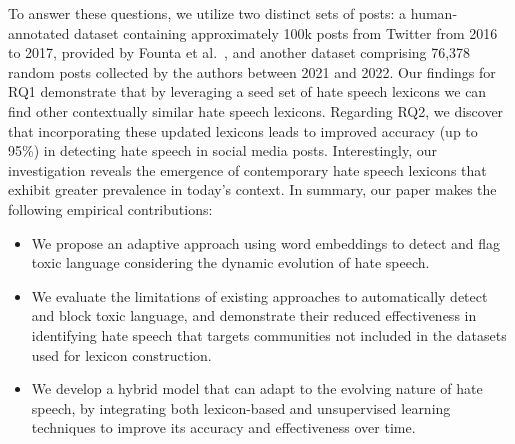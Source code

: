 To answer these questions, we utilize two distinct sets of posts: a human-annotated dataset containing approximately 100k posts from Twitter from 2016 to 2017, provided by Founta et al.~\cite{founta2018large}, and another dataset comprising 76,378 random posts collected by the authors between 2021 and 2022.
Our findings for RQ1 demonstrate that by leveraging a seed set of hate speech lexicons we can find other contextually similar hate speech lexicons.
Regarding RQ2, we discover that incorporating these updated lexicons leads to improved accuracy (up to 95\%) in detecting hate speech in social media posts.
Interestingly, our investigation reveals the emergence of contemporary hate speech lexicons that exhibit greater prevalence in today's context.
In summary, our paper makes the following empirical contributions:

\begin{itemize}
\item We propose an adaptive approach using word embeddings to detect and flag toxic language considering the dynamic evolution of hate speech.
	
\item We evaluate the limitations of existing approaches to automatically detect and block toxic language, and demonstrate their reduced effectiveness in identifying hate speech that targets communities not included in the datasets used for lexicon construction.
	
\item We develop a hybrid model that can adapt to the evolving nature of hate speech, by integrating both lexicon-based and unsupervised learning techniques to improve its accuracy and effectiveness over time.

	
	
\end{itemize}